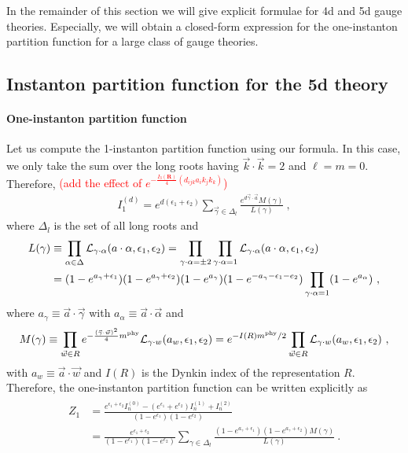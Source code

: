 \documentclass[letterpaper, 11pt]{article}
\def\CL{{\cal L}}
\def\a{\alpha}
\def\g{\gamma}
\def\e{\epsilon}
\begin{document}
In the remainder of this section we will give explicit formulae for 4d and 5d gauge theories. Especially, we will obtain a closed-form expression for the one-instanton partition function for a large class of gauge theories. 

\subsection{Instanton partition function for the 5d theory}


\paragraph{One-instanton partition function}
Let us compute the 1-instanton partition function using our formula. In this case, we only take the sum over the long roots having $\vec{k}\cdot \vec{k} = 2$ and $\ell = m = 0$. Therefore, \textcolor{red}{(add the effect of $e^{- \frac{I_3(\mathbf{R})}{4} (d_{ijk} a_i k_j k_k )}$)}
\begin{align}
 I_1^{(d)} = e^{d(\e_1+\e_2)} \sum_{\vec{\g} \in \Delta_l} \frac{e^{d \vec{\g} \cdot \vec{a} } M(\g) }{L(\g)} \ , 
\end{align} 
where $\Delta_l$ is the set of all long roots and
\begin{align}
\begin{split}
 L(\g) &\equiv \prod_{\a \in \Delta} \CL_{\g \cdot \a} (a \cdot \a, \e_1, \e_2) 
  = \prod_{\g \cdot \a = \pm 2} \prod_{\g \cdot \a = 1} \CL_{\g \cdot \a} (a \cdot \a, \e_1, \e_2) \\
 & = (1-e^{a_\g+\e_1})(1-e^{a_\g+\e_2})(1-e^{a_\g}) (1-e^{-a_\g-\e_1-e_2}) \prod_{\g \cdot \a = 1} (1-e^{a_\a }) \ , 
\end{split}
\end{align}
where $a_\g \equiv \vec{a}\cdot \vec{\g}$ with $a_\a \equiv \vec{a}\cdot \vec{\a}$ and 
\begin{align}
 M(\g) \equiv \prod_{\vec{w} \in R} e^{-\frac{(\vec{\g} \cdot \vec{w})^2}{4}m^{\textrm{phy}} }\CL_{\g \cdot w} (a_w, \e_1, \e_2)  = e^{-I(R)m^{\textrm{phy}}/2} \prod_{\vec{w} \in R} \CL_{\g \cdot w} (a_w, \e_1, \e_2) \ , 
\end{align}
with $a_w \equiv \vec{a} \cdot \vec{w}$ and $I(R)$ is the Dynkin index of the representation $R$. 
Therefore, the one-instanton partition function can be written explicitly as 
\begin{align}
\begin{split}
Z_1 &= \frac{e^{\e_1 + \e_2} I_n^{(0)} - (e^{\e_1} + e^{ \e_2}) I_n^{(1)} + I_n^{(2)} }{(1-e^{\e_1})(1-e^{\e_2})} \\
&= \frac{e^{\e_1+\e_2} }{(1-e^{\e_1})(1-e^{\e_2})} \sum_{\g \in \Delta_l} \frac{(1-e^{a_\g+\e_1})(1-e^{a_\g+\e_2}) M(\g) }{L(\g)} \ . 
\end{split}
\end{align}
\end{document}
